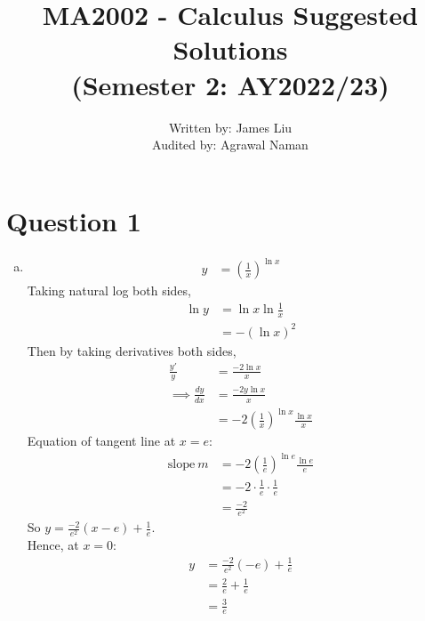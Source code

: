 \documentclass[11pt]{article}
\title{%
  MA2002 - Calculus Suggested Solutions  \\ 
  \large (Semester 2: AY2022/23) \\ }
\author{%
  \large
    Written by: James Liu \\
    Audited by: Agrawal Naman}
\date{}
\begin{document}

\maketitle

\section*{Question 1}
\begin{enumerate}[(a)]
    \item 
    \begin{align*}
        y &= \left(\frac{1}{x}\right)^{\ln x}
    \end{align*}
    Taking natural log both sides, 
    \begin{align*}
        \ln y &= \ln x \ln \frac{1}{x} \\
        &= -(\ln x)^2 
    \end{align*}
    Then by taking derivatives both sides,
    \begin{align*}
        \frac{y'}{y} &= \frac{-2\ln x}{x}\\
        \implies \frac{dy}{dx} &= \frac{-2y\ln x}{x}\\
        &= -2\left(\frac{1}{x}\right)^{\ln x} \frac{\ln x}{x}   
    \end{align*}
    Equation of tangent line at $x=e$: 
    \begin{align*}
        \text{slope} \ m &= -2\left(\frac{1}{e}\right)^{\ln e}\frac{\ln e}{e}\\
        &= -2\cdot \frac{1}{e}\cdot \frac{1}{e}\\
        &= \frac{-2}{e^2}
    \end{align*}
    So $\displaystyle y= \frac{-2}{e^2}(x-e)+\frac{1}{e}$. \\
    Hence, at $x=0$: \begin{align*}
        y&= \frac{-2}{e^2}(-e)+\frac{1}{e}\\
        &= \frac{2}{e}+\frac{1}{e}\\
        &= \frac{3}{e}
    \end{align*}
    

\end{enumerate}
\end{document}
